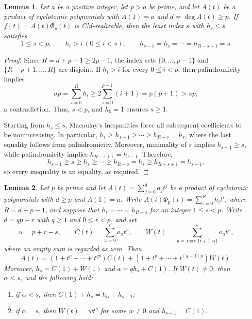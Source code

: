 \documentclass[11pt,a4paper]{amsart}
\newtheorem{lemma}[lemma]{Lemma}
\theoremstyle{definition}
\theoremstyle{remark}
\begin{document}
\begin{lemma}\label{lem:constant-interval}
Let $a$ be a positive integer, let $p>a$ be prime, and let $A(t)$ be a product of cyclotomic polynomials with $A(1)=a$ and $d=\deg A(t)\ge p$. If $f(t)=A(t)\Phi_p(t)$ is CM-realizable, then the least index $s$ with $h_s\le s$ satisfies
\[1\le s<p,\qquad h_i>i\ (0\le i<s),\qquad h_{s-1}=h_s=\cdots=h_{R-s+1}=s.\]
\end{lemma}
\begin{proof}
Since $R=d+p-1 \ge2p-1$, the index sets $\{0,\ldots,p-1\}$ and $\{R-p+1,\ldots,R\}$ are disjoint. If $h_i>i$ for every $0\le i<p$, then palindromicity implies
\[ap=\sum_{i=0}^R h_i\ge2\sum_{i=0}^{p-1}(i+1)=p(p+1)>ap,\]
a contradiction. Thus, $s<p$, and $h_0=1$ ensures $s\ge1$.

Starting from $h_s\le s$, Macaulay's inequalities force all subsequent coefficients to be nonincreasing. In particular, $h_s\ge h_{s+1}\ge\cdots\ge h_{R-s}=h_s$, where the last equality follows from palindromicity. Moreover, minimality of $s$ implies $h_{s-1}\ge s$, while palindromicity implies $h_{R-s+1}=h_{s-1}$.
Therefore, \[h_{s-1} \geq s \geq h_s \geq \cdots \geq h_{R-s} = h_s \geq h_{R-s+1}=h_{s-1},\]
so every inequality is an equality, as required.
\end{proof}
\begin{lemma}\label{lem:residue-decomposition}
Let $p$ be prime and let $A(t)=\sum_{j=0}^d a_jt^j$ be a product of cyclotomic polynomials with $d\ge p$ and $A(1)=a$. Write $A(t)\Phi_p(t)=\sum_{i=0}^R h_it^i$, where $R=d+p-1$, and suppose that $h_s=\cdots=h_{R-s}$ for an integer $1\le s<p$. Write $d=qp+r$ with $q\ge1$ and $0\le r<p$, and set
\[\alpha=p+r-s,\qquad C(t)=\sum_{u=0}^r a_ut^u,\qquad W(t)=\sum_{u=\max\{r+1,\alpha\}}^s a_ut^u,\]
where an empty sum is regarded as zero. Then
\begin{equation}\label{eq:residue-decomposition}
A(t)=(1+t^p+\cdots+t^{qp})C(t)+(1+t^p+\cdots+t^{(q-1)p})W(t).
\end{equation}
Moreover, $h_s=C(1)+W(1)$ and $a=qh_s+C(1)$. If $W(t)\ne0$, then $\alpha\le s$, and the following hold:
\begin{enumerate}[label=\textup{(\roman*)}]
\item if $\alpha<s$, then $C(1)+h_s=h_\alpha+h_{s-1}$;
\item if $\alpha=s$, then $W(t)=wt^s$ for some $w\ne0$ and $h_{s-1}=C(1)$.
\end{enumerate}
\end{lemma}
\end{document}

